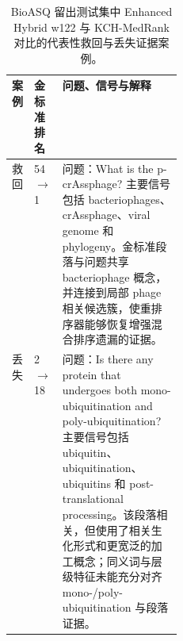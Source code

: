 \begin{table}[t]
\centering
\small
\caption{BioASQ 留出测试集中 Enhanced Hybrid w122 与 KCH-MedRank 对比的代表性救回与丢失证据案例。}
\label{tab:case-study}
\begin{tabularx}{\linewidth}{p{0.12\linewidth}p{0.13\linewidth}X}
\toprule
案例 & 金标准排名 & 问题、信号与解释 \\
\midrule
救回 & 54 $\rightarrow$ 1 & 问题：What is the p-crAssphage? 主要信号包括 bacteriophages、crAssphage、viral genome 和 phylogeny。金标准段落与问题共享 bacteriophage 概念，并连接到局部 phage 相关候选簇，使重排序器能够恢复增强混合排序遗漏的证据。 \\
丢失 & 2 $\rightarrow$ 18 & 问题：Is there any protein that undergoes both mono-ubiquitination and poly-ubiquitination? 主要信号包括 ubiquitin、ubiquitination、ubiquitins 和 post-translational processing。该段落相关，但使用了相关生化形式和更宽泛的加工概念；同义词与层级特征未能充分对齐 mono-/poly-ubiquitination 与段落证据。 \\
\bottomrule
\end{tabularx}
\end{table}
